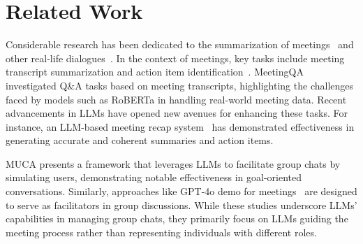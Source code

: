 \section{Related Work}
 Considerable research has been dedicated to the summarization of meetings~\cite{Zhong2021qmsum} and other real-life dialogues~\cite{Mehdad2014summary, Tuggener2021summarysurvey}. In the context of meetings, key tasks include meeting transcript summarization and action item identification~\cite{Cohen2021action}. MeetingQA~\cite{Prasad2023meetingqa} investigated Q\&A tasks based on meeting transcripts, highlighting the challenges faced by models such as RoBERTa in handling real-world meeting data. Recent advancements in LLMs have opened new avenues for enhancing these tasks. For instance, an LLM-based meeting recap system~\cite{Asthana2023recap} has demonstrated effectiveness in generating accurate and coherent summaries and action items.



 MUCA \cite{mao2024muca} presents a framework that leverages LLMs to facilitate group chats by simulating users, demonstrating notable effectiveness in goal-oriented conversations. Similarly, approaches like GPT-4o demo for meetings~\cite{openaivoice} are designed to serve as facilitators in group discussions. While these studies underscore LLMs’ capabilities in managing group chats, they primarily focus on LLMs guiding the meeting process rather than representing individuals with different roles.


